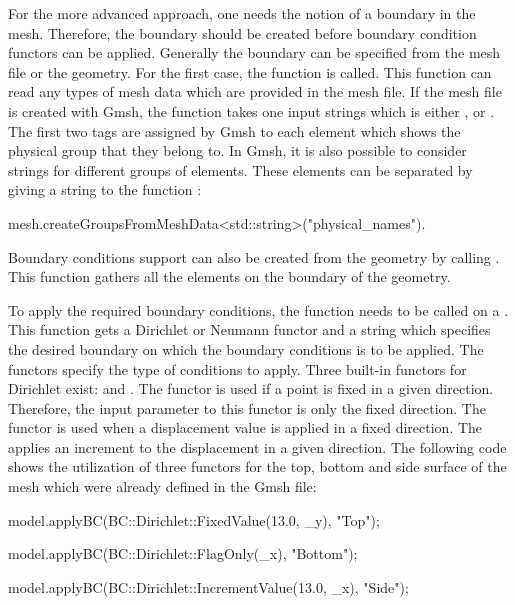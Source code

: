 For the more advanced approach, one needs the notion of a boundary in
the mesh. Therefore, the boundary should be created before boundary
condition functors can be applied. Generally the boundary can be
specified from the mesh file or the geometry.  For the first case, the
function  is called.  This function
can read any types of mesh data which are provided in the mesh
file. If the mesh file is created with Gmsh, the function takes one
input strings which is either ,  or
. The first two tags are assigned by Gmsh to
each element which shows the physical group that they belong to. In
Gmsh, it is also possible to consider strings for different groups of
elements. These elements can be separated by giving a string
 to the function
:
\begin{cpp}
mesh.createGroupsFromMeshData<std::string>("physical_names").
\end{cpp}
Boundary conditions support can also be
created from the geometry by calling
. This function gathers all the
elements on the boundary of the geometry.

To apply the required boundary conditions, the function 
needs to be called on a . This function
gets a Dirichlet or Neumann functor and a string which specifies the
desired boundary on which the boundary conditions is to be
applied. The functors specify the type of conditions to apply. Three
built-in functors for Dirichlet exist: 
and . The functor  is used if a
point is fixed in a given direction. Therefore, the input parameter to
this functor is only the fixed direction. The 
functor is used when a displacement value is applied in a fixed
direction. The  applies an increment to the
displacement in a given direction. The following code shows the
utilization of three functors for the top, bottom and side surface of
the mesh which were already defined in the Gmsh file:

\begin{cpp}
model.applyBC(BC::Dirichlet::FixedValue(13.0, _y), "Top");

model.applyBC(BC::Dirichlet::FlagOnly(_x), "Bottom");

model.applyBC(BC::Dirichlet::IncrementValue(13.0, _x), "Side");
\end{cpp}

